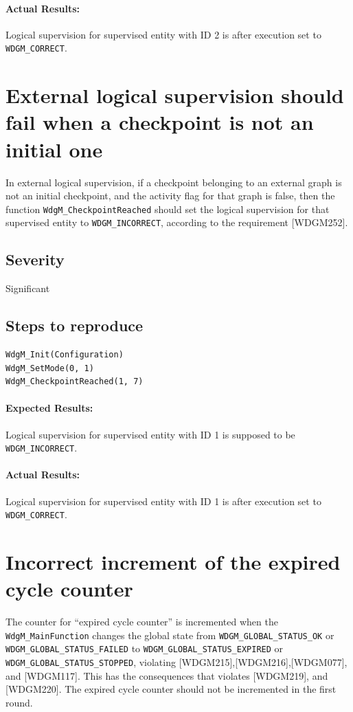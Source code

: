 \paragraph{Actual Results:}
Logical supervision for supervised entity with ID 2 is after execution
set to \lstinline!WDGM_CORRECT!.

\section{External logical supervision should fail when a checkpoint is
  not an initial one}
In external logical supervision, if a checkpoint belonging to an
external graph is not an initial checkpoint, and the activity flag for
that graph is false, then the function \lstinline!WdgM_CheckpointReached! should
set the logical supervision for that supervised entity to
\lstinline!WDGM_INCORRECT!, according to the requirement [WDGM252].

\subsection{Severity}
Significant

\subsection{Steps to reproduce}
\begin{lstlisting}
WdgM_Init(Configuration)
WdgM_SetMode(0, 1)
WdgM_CheckpointReached(1, 7)
\end{lstlisting}
\paragraph{Expected Results:}
Logical supervision for supervised entity with ID 1 is supposed to be
\lstinline!WDGM_INCORRECT!.
\paragraph{Actual Results:}
Logical supervision for supervised entity with ID 1 is after execution
set to \lstinline!WDGM_CORRECT!.

\section{Incorrect increment of the expired cycle counter}
The counter for ``expired cycle counter'' is incremented when the
\lstinline!WdgM_MainFunction! changes the global state from \lstinline!WDGM_GLOBAL_STATUS_OK!
or\\\lstinline!WDGM_GLOBAL_STATUS_FAILED! to \lstinline!WDGM_GLOBAL_STATUS_EXPIRED! or
\lstinline!WDGM_GLOBAL_STATUS_STOPPED!, violating [WDGM215],[WDGM216],[WDGM077],
and [WDGM117]. This has the consequences that violates [WDGM219], and
[WDGM220].  The expired cycle counter should not be incremented in the
first round.

